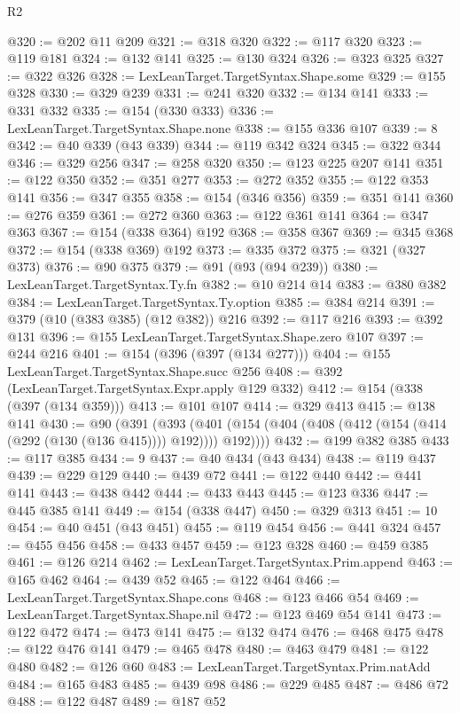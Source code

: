 \begin{lexlean}{R2}
\begin{coremodule}
@320 := @202 @11 @209
@321 := @318 @320
@322 := @117 @320
@323 := @119 @181
@324 := @132 @141
@325 := @130 @324
@326 := @323 @325
@327 := @322 @326
@328 := LexLeanTarget.TargetSyntax.Shape.some
@329 := @155 @328
@330 := @329 @239
@331 := @241 @320
@332 := @134 @141
@333 := @331 @332
@335 := @154 (@330 @333)
@336 := LexLeanTarget.TargetSyntax.Shape.none
@338 := @155 @336 @107
@339 := 8
@342 := @40 @339 (@43 @339)
@344 := @119 @342 @324
@345 := @322 @344
@346 := @329 @256
@347 := @258 @320
@350 := @123 @225 @207 @141
@351 := @122 @350
@352 := @351 @277
@353 := @272 @352
@355 := @122 @353 @141
@356 := @347 @355
@358 := @154 (@346 @356)
@359 := @351 @141
@360 := @276 @359
@361 := @272 @360
@363 := @122 @361 @141
@364 := @347 @363
@367 := @154 (@338 @364) @192
@368 := @358 @367
@369 := @345 @368
@372 := @154 (@338 @369) @192
@373 := @335 @372
@375 := @321 (@327 @373)
@376 := @90 @375
@379 := @91 (@93 (@94 @239))
@380 := LexLeanTarget.TargetSyntax.Ty.fn
@382 := @10 @214 @14
@383 := @380 @382
@384 := LexLeanTarget.TargetSyntax.Ty.option
@385 := @384 @214
@391 := @379 (@10 (@383 @385) (@12 @382)) @216
@392 := @117 @216
@393 := @392 @131
@396 := @155 LexLeanTarget.TargetSyntax.Shape.zero @107
@397 := @244 @216
@401 := @154 (@396 (@397 (@134 @277)))
@404 := @155 LexLeanTarget.TargetSyntax.Shape.succ @256
@408 := @392 (LexLeanTarget.TargetSyntax.Expr.apply @129 @332)
@412 := @154 (@338 (@397 (@134 @359)))
@413 := @101 @107
@414 := @329 @413
@415 := @138 @141
@430 := @90
    (@391
      (@393 (@401 (@154 (@404 (@408 (@412 (@154 (@414 (@292 (@130 (@136 @415)))) @192)))) @192))))
@432 := @199 @382 @385
@433 := @117 @385
@434 := 9
@437 := @40 @434 (@43 @434)
@438 := @119 @437
@439 := @229 @129
@440 := @439 @72
@441 := @122 @440
@442 := @441 @141
@443 := @438 @442
@444 := @433 @443
@445 := @123 @336
@447 := @445 @385 @141
@449 := @154 (@338 @447)
@450 := @329 @313
@451 := 10
@454 := @40 @451 (@43 @451)
@455 := @119 @454
@456 := @441 @324
@457 := @455 @456
@458 := @433 @457
@459 := @123 @328
@460 := @459 @385
@461 := @126 @214
@462 := LexLeanTarget.TargetSyntax.Prim.append
@463 := @165 @462
@464 := @439 @52
@465 := @122 @464
@466 := LexLeanTarget.TargetSyntax.Shape.cons
@468 := @123 @466 @54
@469 := LexLeanTarget.TargetSyntax.Shape.nil
@472 := @123 @469 @54 @141
@473 := @122 @472
@474 := @473 @141
@475 := @132 @474
@476 := @468 @475
@478 := @122 @476 @141
@479 := @465 @478
@480 := @463 @479
@481 := @122 @480
@482 := @126 @60
@483 := LexLeanTarget.TargetSyntax.Prim.natAdd
@484 := @165 @483
@485 := @439 @98
@486 := @229 @485
@487 := @486 @72
@488 := @122 @487
@489 := @187 @52

\end{coremodule}
\end{lexlean}
